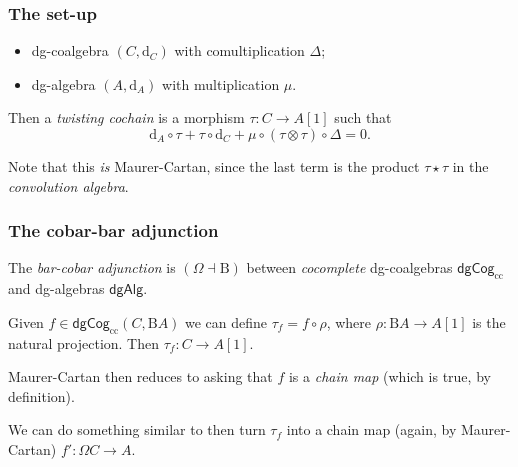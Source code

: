 \documentclass{beamer}
\begin{document}
        \begin{frame}\frametitle{The set-up}
            \begin{itemize}
                \item dg-coalgebra $(C,\mathrm{d}_C)$ with comultiplication $\Delta$;
                \pause
                \item dg-algebra $(A,\mathrm{d}_A)$ with multiplication $\mu$.
            \end{itemize}

            \pause

            Then a \emph{twisting cochain} is a morphism $\tau\colon C\to A[1]$ such that
            \begin{equation*}
                \mathrm{d}_A\circ\tau + \tau\circ\mathrm{d}_C + \mu\circ(\tau\otimes\tau)\circ\Delta = 0.
            \end{equation*}

            \pause

            Note that this \emph{is} Maurer-Cartan, since the last term is the product $\tau\star\tau$ in the \emph{convolution algebra}.
        \end{frame}

        \begin{frame}\frametitle{The cobar-bar adjunction}
            The \emph{bar-cobar adjunction} is $(\Omega\dashv\mathrm{B})$ between  \emph{cocomplete} dg-coalgebras $\mathsf{dgCog}_{\mathrm{cc}}$ and dg-algebras $\mathsf{dgAlg}$.
            
            \pause

            Given $f\in\mathsf{dgCog}_{\mathrm{cc}}(C,\mathrm{B}A)$ we can define $\tau_f=f\circ\rho$, where $\rho\colon\mathrm{B}A\to A[1]$ is the natural projection.
            Then $\tau_f\colon C\to A[1]$.

            \pause

            Maurer-Cartan then reduces to asking that $f$ is a \emph{chain map} (which is true, by definition).

            \pause

            We can do something similar to then turn $\tau_f$ into a chain map (again, by Maurer-Cartan) $f'\colon\Omega C\to A$.
        \end{frame}
\end{document}
